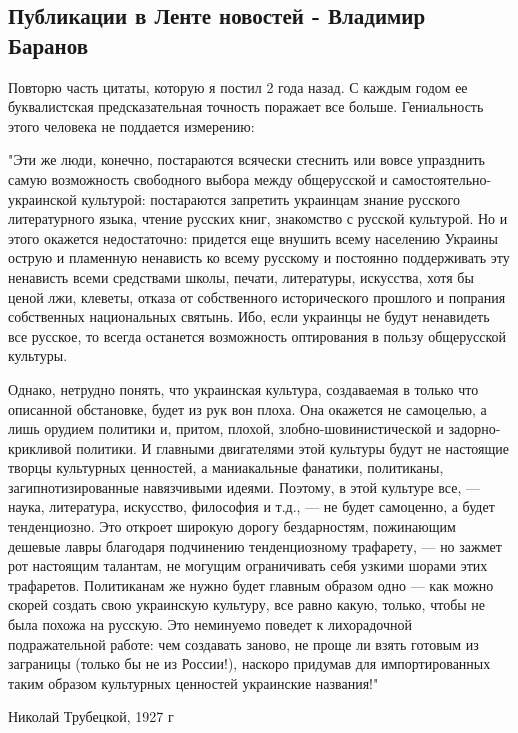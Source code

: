  
 
 
 
 

\subsection{Публикации в Ленте новостей - Владимир Баранов}

Повторю часть цитаты, которую я постил 2 года назад. С каждым годом ее
буквалистская предсказательная точность поражает все больше. Гениальность этого
человека не поддается измерению:

"Эти же люди, конечно, постараются всячески стеснить или вовсе упразднить самую
возможность свободного выбора между общерусской и самостоятельно-украинской
культурой: постараются запретить украинцам знание русского литературного языка,
чтение русских книг, знакомство с русской культурой. Но и этого окажется
недостаточно: придется еще внушить всему населению Украины острую и пламенную
ненависть ко всему русскому и постоянно поддерживать эту ненависть всеми
средствами школы, печати, литературы, искусства, хотя бы ценой лжи, клеветы,
отказа от собственного исторического прошлого и попрания собственных
национальных святынь. Ибо, если украинцы не будут ненавидеть все русское, то
всегда останется возможность оптирования в пользу общерусской культуры.

Однако, нетрудно понять, что украинская культура, создаваемая в только что
описанной обстановке, будет из рук вон плоха. Она окажется не самоцелью, а лишь
орудием политики и, притом, плохой, злобно-шовинистической и задорно-крикливой
политики. И главными двигателями этой культуры будут не настоящие творцы
культурных ценностей, а маниакальные фанатики, политиканы, загипнотизированные
навязчивыми идеями. Поэтому, в этой культуре все, — наука, литература,
искусство, философия и т.д., — не будет самоценно, а будет тенденциозно. Это
откроет широкую дорогу бездарностям, пожинающим дешевые лавры благодаря
подчинению тенденциозному трафарету, — но зажмет рот настоящим талантам, не
могущим ограничивать себя узкими шорами этих трафаретов. Политиканам же нужно
будет главным образом одно — как можно скорей создать свою украинскую культуру,
все равно какую, только, чтобы не была похожа на русскую. Это неминуемо поведет
к лихорадочной подражательной работе: чем создавать заново, не проще ли взять
готовым из заграницы (только бы не из России!), наскоро придумав для
импортированных таким образом культурных ценностей украинские названия!"

Николай Трубецкой, 1927 г
